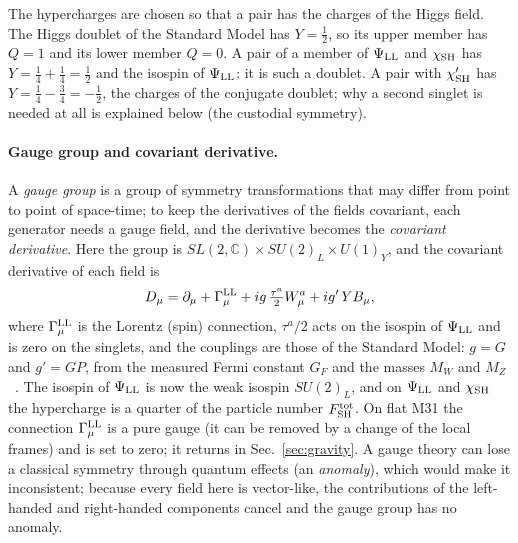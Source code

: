 \documentclass[aps,prd,twocolumn,superscriptaddress,nofootinbib,floatfix,longbibliography]{revtex4-2}
\newcommand{\LL}{{\rm LL}}
\newcommand{\SH}{{\rm SH}}
\begin{document}
The hypercharges are chosen so that a pair has the charges of the Higgs field. The Higgs doublet of the Standard Model
has $Y=\frac12$, so its upper member has $Q=1$ and its lower member $Q=0$. A pair of a member of $\Psi_\LL$ and $\chi_\SH$
has $Y=\frac14+\frac14=\frac12$ and the isospin of $\Psi_\LL$: it is such a doublet. A pair with $\chi'_\SH$ has
$Y=\frac14-\frac34=-\frac12$, the charges of the conjugate doublet; why a second singlet is needed at all is explained
below (the custodial symmetry).

\paragraph*{Gauge group and covariant derivative.}
A \emph{gauge group} is a group of symmetry transformations that may differ from point to point of space-time; to keep
the derivatives of the fields covariant, each generator needs a gauge field, and the derivative becomes the
\emph{covariant derivative}. Here the group is $SL(2,\mathbb C)\times SU(2)_L\times U(1)_Y$, and the covariant
derivative of each field is
\begin{equation}
D_\mu=\partial_\mu+\Gamma^\LL_\mu+ig\,\tfrac{\tau^a}{2}W^a_\mu+ig'\,Y B_\mu ,
\label{eq:cov}
\end{equation}
where $\Gamma^\LL_\mu$ is the Lorentz (spin) connection, $\tau^a/2$ acts on the isospin of $\Psi_\LL$ and is zero on the
singlets, and the couplings are those of the Standard Model: $g={{G}}$ and $g'={{GP}}$, from the measured Fermi constant
$G_F$ and the masses $M_W$ and $M_Z$~\cite{PDG2026}. The isospin of $\Psi_\LL$ is now the weak isospin $SU(2)_L$, and on
$\Psi_\LL$ and $\chi_\SH$ the hypercharge is a quarter of the particle number $F^{\rm tot}_\SH$. On flat M31 the
connection $\Gamma^\LL_\mu$ is a pure gauge (it can be removed by a change of the local frames) and is set to zero; it
returns in Sec.~\ref{sec:gravity}. A gauge theory can lose a classical symmetry through quantum effects (an
\emph{anomaly}), which would make it inconsistent; because every field here is vector-like, the contributions of the
left-handed and right-handed components cancel and the gauge group has no anomaly.
\end{document}
